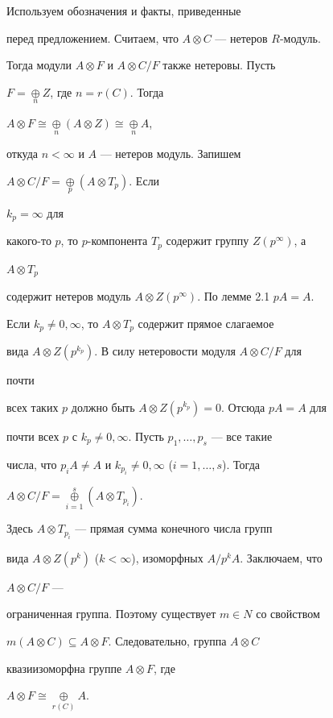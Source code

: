 \begin{pf} 


Используем обозначения и факты, приведенные 


перед предложением. Считаем, что $A\otimes C$ --- нетеров $R$-модуль. 


Тогда модули $A\otimes F$ и $A\otimes C/F$ также нетеровы. Пусть 


$F=\mathop{\oplus}\limits_{n}Z$, где $n=r(C)$. Тогда 


$A\otimes F\cong\mathop{\oplus}\limits_{n}(A\otimes Z)\cong 


\mathop{\oplus}\limits_{n}A$, 


откуда $n<\infty$ и $A$ --- нетеров модуль. Запишем 


$A\otimes C/F=\mathop{\oplus}\limits_{p}(A\otimes T_p)$. Если 


$k_p=\infty$ для 


какого-то $p$, то $p$-компонента $T_p$ содержит группу $Z(p^\infty)$, а 


$A\otimes T_p$ 


содержит нетеров модуль $A\otimes Z(p^\infty)$. По лемме 2.1\; $pA=A$. 


Если $k_p\ne0,\infty$, то $A\otimes T_p$ содержит прямое слагаемое 


вида $A\otimes Z(p^{k_p})$. В силу нетеровости модуля $A\otimes C/F$ для 


почти 


всех таких $p$ должно быть $A\otimes Z(p^{k_p})=0$. Отсюда $pA=A$ для 


почти всех $p$ с $k_p\ne0,\infty$. Пусть $p_1,\dotsc,p_s$ --- все такие 


числа, что $p_i A\ne A$ и $k_{p_i}\ne0,\infty$ ($i=1,\dotsc,s$). Тогда 


$A\otimes C/F=\mathop{\oplus}\limits^s_{i=1}(A\otimes T_{p_i})$. 


Здесь $A\otimes T_{p_i}$ --- прямая сумма конечного числа групп 


вида $A\otimes Z(p^k)$ ($k<\infty$), изоморфных $A/p^k A$. Заключаем, что 


$A\otimes C/F$ --- 


ограниченная группа. Поэтому существует $m\in N$ со свойством 


$m(A\otimes C)\subseteq A\otimes F$. Следовательно, группа $A\otimes C$ 


квазиизоморфна группе $A\otimes F$, где 


$A\otimes F\cong\mathop{\oplus}\limits_{r(C)}A$. 



\end{pf}
